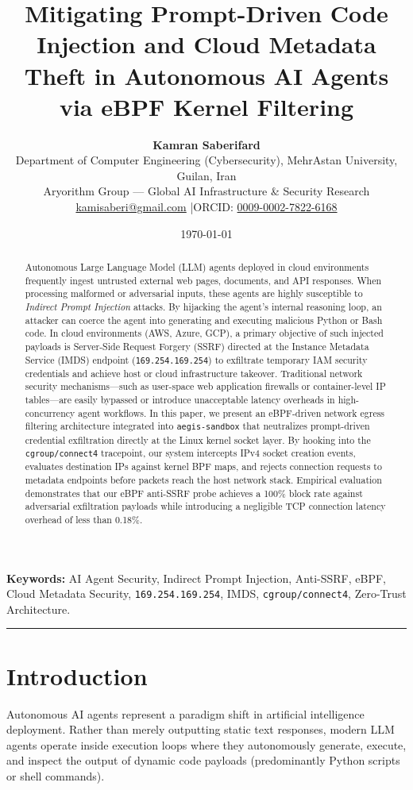 \documentclass[11pt,a4paper]{article}
\title{\Large\bfseries Mitigating Prompt-Driven Code Injection and Cloud Metadata Theft in Autonomous AI Agents via eBPF Kernel Filtering}
\author{
    \textbf{Kamran Saberifard}\\[4pt]
    Department of Computer Engineering (Cybersecurity), MehrAstan University, Guilan, Iran\\
    Aryorithm Group — Global AI Infrastructure \& Security Research\\
    \href{mailto:kamisaberi@gmail.com}{kamisaberi@gmail.com} \quad|\quad ORCID: \href{https://orcid.org/0009-0002-7822-6168}{0009-0002-7822-6168}
}
\date{\today}
\begin{document}
\maketitle

\begin{abstract}
\noindent Autonomous Large Language Model (LLM) agents deployed in cloud environments frequently ingest untrusted external web pages, documents, and API responses. When processing malformed or adversarial inputs, these agents are highly susceptible to \textit{Indirect Prompt Injection} attacks. By hijacking the agent's internal reasoning loop, an attacker can coerce the agent into generating and executing malicious Python or Bash code. In cloud environments (AWS, Azure, GCP), a primary objective of such injected payloads is Server-Side Request Forgery (SSRF) directed at the Instance Metadata Service (IMDS) endpoint (\texttt{169.254.169.254}) to exfiltrate temporary IAM security credentials and achieve host or cloud infrastructure takeover. Traditional network security mechanisms—such as user-space web application firewalls or container-level IP tables—are easily bypassed or introduce unacceptable latency overheads in high-concurrency agent workflows. In this paper, we present an eBPF-driven network egress filtering architecture integrated into \texttt{aegis-sandbox} that neutralizes prompt-driven credential exfiltration directly at the Linux kernel socket layer. By hooking into the \texttt{cgroup/connect4} tracepoint, our system intercepts IPv4 socket creation events, evaluates destination IPs against kernel BPF maps, and rejects connection requests to metadata endpoints before packets reach the host network stack. Empirical evaluation demonstrates that our eBPF anti-SSRF probe achieves a 100\% block rate against adversarial exfiltration payloads while introducing a negligible TCP connection latency overhead of less than 0.18\%.
\end{abstract}

\vspace{6pt}
\noindent\textbf{Keywords:} AI Agent Security, Indirect Prompt Injection, Anti-SSRF, eBPF, Cloud Metadata Security, \texttt{169.254.169.254}, IMDS, \texttt{cgroup/connect4}, Zero-Trust Architecture.

\vspace{8pt}
\hrule
\vspace{12pt}

\section{Introduction}
Autonomous AI agents represent a paradigm shift in artificial intelligence deployment. Rather than merely outputting static text responses, modern LLM agents operate inside execution loops where they autonomously generate, execute, and inspect the output of dynamic code payloads (predominantly Python scripts or shell commands).
\end{document}
